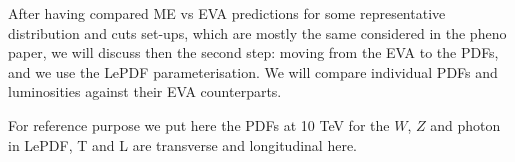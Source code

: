 \documentclass[a4paper,11pt]{article}
\begin{document}
\begin{table}[!t]
\begin{center}
\caption{
EW chiral couplings and coupling strength normalizations used in the EVA for fermions $f,f'$ with weak isospin charge $(T_3^f)_L=\pm1/2$ and electric charge $Q^f$, with normalization $Q^\ell=-1$.
}
\label{tab:ewa_coup}
\end{center}
\end{table}



After having compared ME vs EVA predictions for some representative distribution and cuts set-ups, which are mostly the same considered in the pheno paper, we will discuss then the second step: moving from the EVA to the PDFs, and we use the {\small \sc LePDF} parameterisation.
We will compare individual PDFs and luminosities against their EVA counterparts.

For reference purpose we put here the PDFs at 10 TeV for the $W$, $Z$ and photon in {\small \sc LePDF}, T and L are transverse and longitudinal here.
\end{document}
